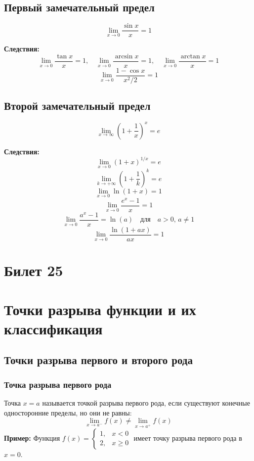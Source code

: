 \documentclass{article}
\begin{document}
\subsection*{Первый замечательный предел}
\[
\lim_{x \to 0} \frac{\sin x}{x} = 1
\]

\textbf{Следствия:}
\[
\lim_{x \to 0} \frac{\tan x}{x} = 1, \quad \lim_{x \to 0} \frac{\arcsin x}{x} = 1, \quad \lim_{x \to 0} \frac{\arctan x}{x} = 1
\]
\[
\lim_{x \to 0} \frac{1 - \cos x}{x^2/2} = 1
\]

\subsection*{Второй замечательный предел}
\[
\lim_{x \to \infty} \left(1 + \frac{1}{x}\right)^x = e
\]

\textbf{Следствия:}
\[
\lim_{x \to 0} (1 + x)^{1/x} = e
\]
\[
\lim_{k \to +\infty} \left(1 + \frac{1}{k}\right)^k = e
\]
\[
\lim_{x \to 0} \ln(1 + x) = 1
\]
\[
\lim_{x \to 0} \frac{e^x - 1}{x} = 1
\]
\[
\lim_{x \to 0} \frac{a^x - 1}{x} = \ln(a) \quad \text{для} \quad a > 0, \, a \neq 1
\]
\[
\lim_{x \to 0} \frac{\ln(1 + ax)}{ax} = 1
\]

\section{Билет 25}

\section*{Точки разрыва функции и их классификация}

\subsection*{Точки разрыва первого и второго рода}

\subsubsection*{Точка разрыва первого рода}
Точка $x = a$ называется точкой разрыва первого рода, если существуют конечные односторонние пределы, но они не равны:
\[
\lim_{x \to a^-} f(x) \neq \lim_{x \to a^+} f(x)
\]
\textbf{Пример:} Функция $f(x) = \begin{cases} 
1, & x < 0 \\
2, & x \geq 0 
\end{cases}$ имеет точку разрыва первого рода в $x = 0$.
\end{document}
